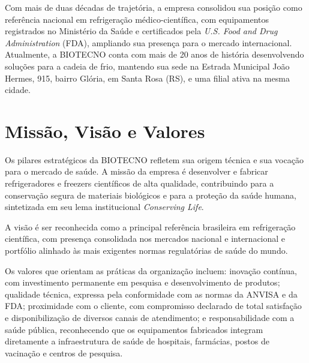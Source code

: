 Com mais de duas décadas de trajetória, a empresa consolidou sua posição como referência nacional em
refrigeração médico-científica, com equipamentos registrados no Ministério da Saúde e certificados pela
\textit{U.S. Food and Drug Administration} (FDA), ampliando sua presença para o mercado
internacional. Atualmente, a BIOTECNO conta com mais de 20 anos de história desenvolvendo
soluções para a cadeia de frio, mantendo sua sede na Estrada Municipal João Hermes, 915,
bairro Glória, em Santa Rosa (RS), e uma filial ativa na mesma cidade.

\section{Missão, Visão e Valores}
\label{sec:missao-visao-valores}

Os pilares estratégicos da BIOTECNO refletem sua origem técnica e sua vocação para o mercado de saúde.
A missão da empresa é desenvolver e fabricar refrigeradores e freezers científicos de alta qualidade,
contribuindo para a conservação segura de materiais biológicos e para a proteção da saúde humana,
sintetizada em seu lema institucional \textit{Conserving Life}.

A visão é ser reconhecida como a principal referência brasileira em refrigeração científica, com
presença consolidada nos mercados nacional e internacional e portfólio alinhado às mais exigentes
normas regulatórias de saúde do mundo.

Os valores que orientam as práticas da organização incluem: inovação contínua, com investimento
permanente em pesquisa e desenvolvimento de produtos; qualidade técnica, expressa pela conformidade
com as normas da ANVISA e da FDA; proximidade com o cliente, com compromisso declarado de total
satisfação e disponibilização de diversos canais de atendimento; e responsabilidade com
a saúde pública, reconhecendo que os equipamentos fabricados integram diretamente a infraestrutura
de saúde de hospitais, farmácias, postos de vacinação e centros de pesquisa.
